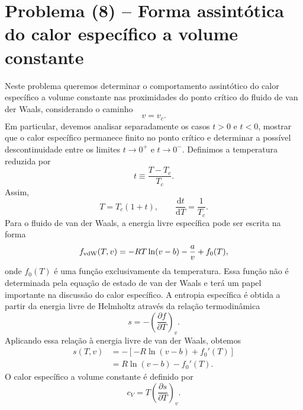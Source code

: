 \documentclass[11pt,a4paper]{article}
\newcommand{\pd}[2]{\frac{\partial #1}{\partial #2}}
\renewcommand{\dd}{\mathrm{d}}
\begin{document}
\section*{Problema (8) -- Forma assintótica do calor específico a volume constante}
Neste problema queremos determinar o comportamento assintótico do calor
específico a volume constante nas proximidades do ponto crítico do fluido de
van der Waals, considerando o caminho
%
\begin{equation}
    v=v_c.
\end{equation}
Em particular, devemos analisar separadamente os casos $t>0$ e $t<0$,
mostrar que o calor específico permanece finito no ponto crítico e determinar
a possível descontinuidade entre os limites $t\to0^+$ e $t\to0^-$.
%
Definimos a temperatura reduzida por
\begin{equation}
    t\equiv\frac{T-T_c}{T_c}.
    \label{eq:t_reduced_cv}
\end{equation}
%
Assim,
%
\begin{equation}
    T=T_c(1+t),
    \qquad
    \frac{\dd t}{\dd T}=\frac{1}{T_c}.
    \label{eq:t_derivative_cv}
\end{equation}
%
Para o fluido de van der Waals, a energia livre específica pode ser escrita
na forma
%
\begin{equation}
    f_{\rm vdW}(T,v)
    =
    -RT\ln(v-b)-\frac{a}{v}+f_0(T),
    \label{eq:vdw_free_energy_cv}
\end{equation}
%
onde $f_0(T)$ é uma função exclusivamente da temperatura. Essa função não é determinada pela equação de estado de van der Waals e terá um papel importante na discussão do calor específico.
%
A entropia específica é obtida a partir da energia livre de Helmholtz através da relação termodinâmica
%
\begin{equation}
    s
    =
    -\left(\pd{f}{T}\right)_v.
    \label{eq:entropy_free_energy}
\end{equation}
%
Aplicando essa relação à energia livre de van der Waals, obtemos
%
\begin{align}
    s(T,v)
    &=
    -\left[
    -R\ln(v-b)+f_0'(T)
    \right]
    \nonumber\\
    &=
    R\ln(v-b)-f_0'(T).
    \label{eq:entropy_vdw}
\end{align}
%
O calor específico a volume constante é definido por
%
\begin{equation}
    c_V
    =
    T\left(\pd{s}{T}\right)_v.
    \label{eq:cv_definition}
\end{equation}
\end{document}
